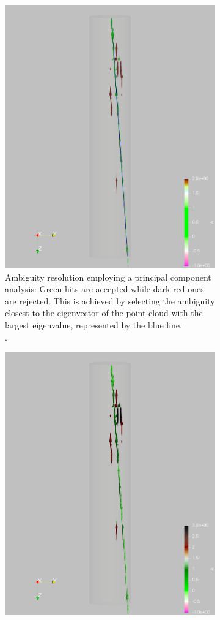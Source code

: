 \documentclass[instruments,article,accept,moreauthors,pdftex]{Definitions/mdpi}
\begin{document}
\begin{figure}[H]
\begin{subfigure}{\textwidth}
		\includegraphics[viewport=600 0 1000 2000, clip, height=\textwidth, angle=90]{event967_pulses_a_pca}
		\caption{Ambiguity resolution employing a principal component analysis:
			Green hits are accepted while dark red ones are rejected.
			This is achieved by selecting the ambiguity closest to the eigenvector of the point cloud with the largest eigenvalue, represented by the blue line.\\.}
		\label{fig:pca_b}
	\end{subfigure}
	\begin{subfigure}{\textwidth}
		\centering
		\includegraphics[viewport=600 0 1000 2000, clip, height=\textwidth, angle=90]{event967_pulses_a_det}

\end{subfigure}
\end{figure}
\end{document}
